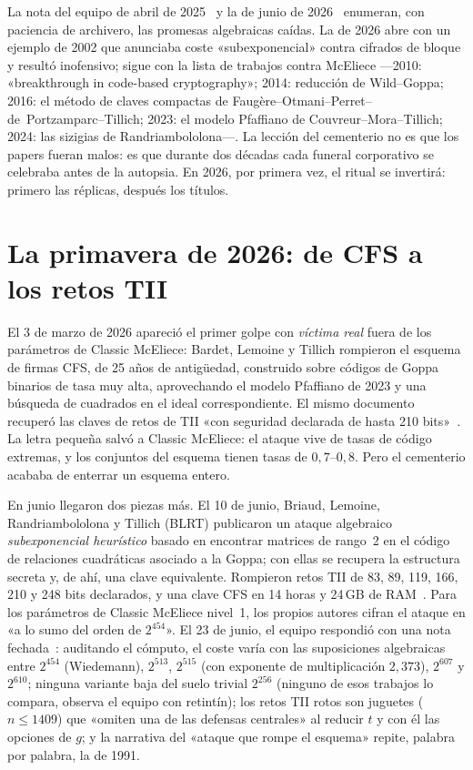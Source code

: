 \begin{historia}
La nota del equipo de abril de 2025~\cite{cm529} y la de junio de
2026~\cite{cm610} enumeran, con paciencia de archivero, las
promesas algebraicas caídas. La de 2026 abre con un ejemplo de 2002
que anunciaba coste «subexponencial» contra cifrados de bloque y
resultó inofensivo; sigue con la lista de trabajos contra McEliece
---2010: «breakthrough in code-based cryptography»; 2014:
reducción de Wild--Goppa; 2016: el método de claves compactas de
Faugère--Otmani--Perret--de~Portzamparc--Tillich; 2023: el
modelo Pfaffiano de Couvreur--Mora--Tillich; 2024: las sizigias de
Randriambololona---. La lección del cementerio no es que los papers
fueran malos: es que durante dos décadas cada funeral corporativo
se celebraba antes de la autopsia. En 2026, por primera vez, el
ritual se invertirá: primero las réplicas, después los títulos.
\end{historia}

\section{La primavera de 2026: de CFS a los retos TII}\label{sec:2026-primavera}

El 3 de marzo de 2026 apareció el primer golpe con \emph{víctima
real} fuera de los parámetros de Classic McEliece: Bardet, Lemoine y
Tillich rompieron el esquema de firmas CFS, de 25 años de
antigüedad, construido sobre códigos de Goppa binarios de tasa muy
alta, aprovechando el modelo Pfaffiano de 2023 y una búsqueda de
cuadrados en el ideal correspondiente. El mismo documento recuperó
las claves de retos de TII «con seguridad declarada de hasta 210
bits»~\cite{bardet2026}. La letra pequeña salvó a Classic McEliece:
el ataque vive de tasas de código extremas, y los conjuntos del
esquema tienen tasas de $0{,}7$--$0{,}8$. Pero el cementerio acababa
de enterrar un esquema entero.

En junio llegaron dos piezas más. El 10 de junio, Briaud, Lemoine,
Randriambololona y Tillich (BLRT) publicaron un ataque algebraico
\emph{subexponencial heurístico} basado en encontrar matrices de
rango~2 en el código de relaciones cuadráticas asociado a la Goppa;
con ellas se recupera la estructura secreta y, de ahí, una clave
equivalente. Rompieron retos TII de 83, 89, 119, 166, 210 y 248
bits declarados, y una clave CFS en 14 horas y 24\,GB de
RAM~\cite{briaud2026}. Para los parámetros de Classic McEliece
nivel~1, los propios autores cifran el ataque en «a lo sumo del
orden de $2^{454}$». El 23 de junio, el equipo respondió con una
nota fechada~\cite{cm610}: auditando el cómputo, el coste varía con
las suposiciones algebraicas entre $2^{454}$ (Wiedemann), $2^{513}$,
$2^{515}$ (con exponente de multiplicación $2{,}373$), $2^{607}$ y
$2^{610}$; ninguna variante baja del suelo trivial $2^{256}$
(ninguno de esos trabajos lo compara, observa el equipo con
retintín); los retos TII rotos son juguetes ($n\le 1409$) que
«omiten una de las defensas centrales» al reducir $t$ y con él las
opciones de $g$; y la narrativa del «ataque que rompe el esquema»
repite, palabra por palabra, la de 1991.

